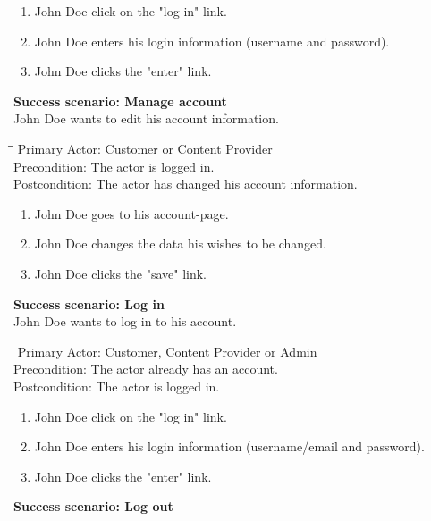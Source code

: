 \begin{enumerate} \setlength{\itemsep}{-1mm}
	\item John Doe click on the "log in" link.
	\item John Doe enters his login information (username and password).
	\item John Doe clicks the "enter" link.
\end{enumerate}
\vspace{3mm}
\textbf{Success scenario: Manage account} \\
John Doe wants to edit his account information.
\begin{tabbing}
\hspace{5mm}\=\hspace{26mm}\=\kill
\>Primary Actor:\> Customer or Content Provider\\
\>Precondition:\> The actor is logged in.\\
\>Postcondition:\> The actor has changed his account information.
\end{tabbing}
\begin{enumerate} \setlength{\itemsep}{-1mm}
	\item John Doe goes to his account-page.
	\item John Doe changes the data his wishes to be changed.
	\item John Doe clicks the "save" link.
\end{enumerate}
\vspace{3mm}
\textbf{Success scenario: Log in} \\
John Doe wants to log in to his account. 
\begin{tabbing}
\hspace{5mm}\=\hspace{26mm}\=\kill
\>Primary Actor:\> Customer, Content Provider or Admin\\
\>Precondition:\> The actor already has an account.\\
\>Postcondition:\> The actor is logged in.
\end{tabbing}
\begin{enumerate} \setlength{\itemsep}{-1mm}
	\item John Doe click on the "log in" link.
	\item John Doe enters his login information (username/email and password).
	\item John Doe clicks the "enter" link.
\end{enumerate}
\vspace{3mm}
\textbf{Success scenario: Log out} \\

